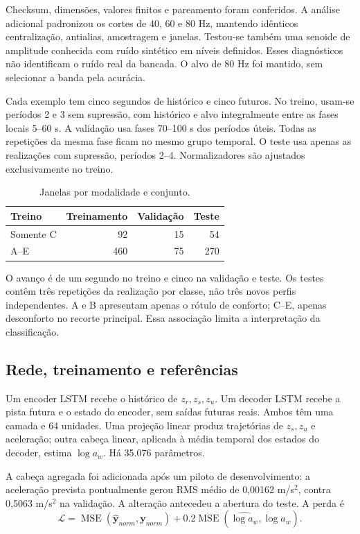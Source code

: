\documentclass[conference]{IEEEtran}
\begin{document}
Checksum, dimensões, valores finitos e pareamento foram conferidos. A análise adicional padronizou os cortes de 40, 60 e 80 Hz, mantendo idênticos centralização, antialias, amostragem e janelas. Testou-se também uma senoide de amplitude conhecida com ruído sintético em níveis definidos. Esses diagnósticos não identificam o ruído real da bancada. O alvo de 80 Hz foi mantido, sem selecionar a banda pela acurácia.

Cada exemplo tem cinco segundos de histórico e cinco futuros. No treino, usam-se períodos 2 e 3 sem supressão, com histórico e alvo integralmente entre as fases locais 5--60 s. A validação usa fases 70--100 s dos períodos úteis. Todas as repetições da mesma fase ficam no mesmo grupo temporal. O teste usa apenas as realizações com supressão, períodos 2--4. Normalizadores são ajustados exclusivamente no treino.

\begin{table}[t]
\caption{Janelas por modalidade e conjunto.}
\centering
\begin{tabular}{lrrr}\toprule
Treino & Treinamento & Validação & Teste\\\midrule
Somente C & 92 & 15 & 54\\
A--E & 460 & 75 & 270\\\bottomrule
\end{tabular}
\end{table}

O avanço é de um segundo no treino e cinco na validação e teste. Os testes contêm três repetições da realização por classe, não três novos perfis independentes. A e B apresentam apenas o rótulo de conforto; C--E, apenas desconforto no recorte principal. Essa associação limita a interpretação da classificação.

\subsection{Rede, treinamento e referências}
Um encoder LSTM recebe o histórico de $z_r,z_s,z_u$. Um decoder LSTM recebe a pista futura e o estado do encoder, sem saídas futuras reais. Ambos têm uma camada e 64 unidades. Uma projeção linear produz trajetórias de $z_s,z_u$ e aceleração; outra cabeça linear, aplicada à média temporal dos estados do decoder, estima $\log a_w$. Há 35.076 parâmetros.

A cabeça agregada foi adicionada após um piloto de desenvolvimento: a aceleração prevista pontualmente gerou RMS médio de 0,00162 m/s$^2$, contra 0,5063 m/s$^2$ na validação. A alteração antecedeu a abertura do teste. A perda é
\begin{equation}
\mathcal L=\operatorname{MSE}(\hat{\boldsymbol y}_{norm},\boldsymbol y_{norm})+
0.2\operatorname{MSE}(\widehat{\log a_w},\log a_w).
\end{equation}
\end{document}

